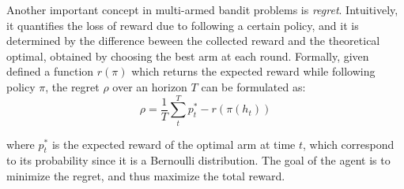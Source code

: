 Another important concept in multi-armed bandit problems is \textit{regret}. Intuitively, it quantifies the loss of reward due to following a certain policy, and it is determined by the difference beween the collected reward and the theoretical optimal, obtained by choosing the best arm at each round.
Formally, given defined a function $r(\pi)$ which returns the expected reward while following policy $\pi$, the regret $\rho$ over an horizon $T$ can be formulated as:
\begin{equation}
    \rho = \frac{1}{T}\sum^{T}_{t} p^{*}_{t} -r(\pi(h_{t}))
\end{equation}

\noindent where $p^{*}_{t}$ is the expected reward of the optimal arm at time $t$, which correspond to its probability since it is a Bernoulli distribution.
\noindent The goal of the agent is to minimize the regret, and thus maximize the total reward.





